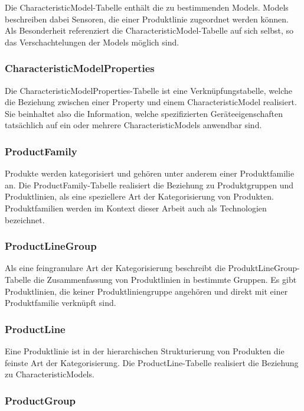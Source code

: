 Die CharacteristicModel-Tabelle enthält die zu bestimmenden Models. Models beschreiben dabei Sensoren, die einer Produktlinie zugeordnet werden können. Als Besonderheit referenziert die CharacteristicModel-Tabelle auf sich selbst, so das Verschachtelungen der Models möglich sind.

\subsubsection{CharacteristicModelProperties}

Die CharacteristicModelProperties-Tabelle ist eine Verknüpfungstabelle, welche die Beziehung zwischen einer Property und einem CharacteristicModel realisiert. Sie beinhaltet also die Information, welche spezifizierten Geräteeigenschaften tatsächlich auf ein oder mehrere CharacteristicModels anwendbar sind.

\subsubsection{ProductFamily}

Produkte werden kategorisiert und gehören unter anderem einer Produktfamilie an. Die ProductFamily-Tabelle realisiert die Beziehung zu Produktgruppen und Produktlinien, als eine speziellere Art der Kategorisierung von Produkten. Produktfamilien werden im Kontext dieser Arbeit auch als Technologien bezeichnet.

\subsubsection{ProductLineGroup}

Als eine feingranulare Art der Kategorisierung beschreibt die ProduktLineGroup-Tabelle die Zusammenfassung von Produktlinien in bestimmte Gruppen. Es gibt Produktlinien, die keiner Produktliniengruppe angehören und direkt mit einer Produktfamilie verknüpft sind.

\subsubsection{ProductLine}

Eine Produktlinie ist in der hierarchischen Strukturierung von Produkten die feinste Art der Kategorisierung. Die ProductLine-Tabelle realisiert die Beziehung zu CharacteristicModels.

\subsubsection{ProductGroup}

